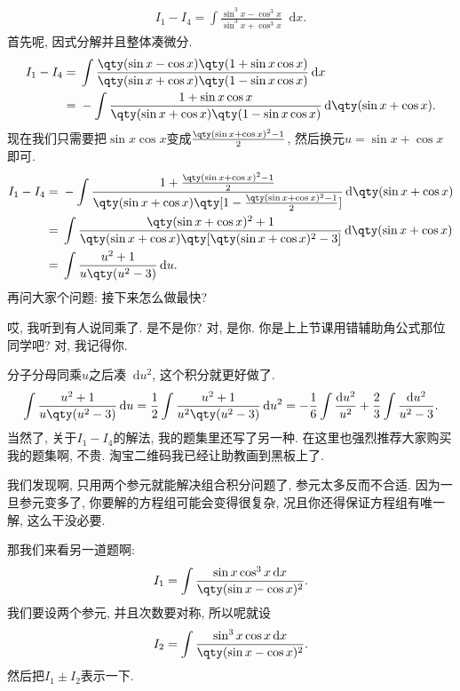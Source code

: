 \documentclass{ctexbook}
\newcommand*{\dif}{\mathop{}\!\mathrm{d}}
\begin{document}
{\begin{align*}
I_{1}-I_{4}=\int\frac{\sin^{3}{x}-\cos^{3}{x}}{\sin^{3}{x}+\cos^{3}{x}}\dif{x}
.\end{align*}
首先呢, 因式分解并且整体凑微分. 
\begin{align*}
I_{1}-I_{4}={}&\int\frac{\qty(\sin{x}-\cos{x})\qty(1+\sin{x}\cos{x})}{\qty(\sin{x}+\cos{x})\qty(1-\sin{x}\cos{x})}\dif{x}\\
={}&-\int\frac{1+\sin{x}\cos{x}}{\qty(\sin{x}+\cos{x})\qty(1-\sin{x}\cos{x})}\dif{\qty(\sin{x}+\cos{x})}
.\end{align*}
现在我们只需要把$\sin{x}\cos{x}$变成$\frac{\qty(\sin{x}+\cos{x})^{2}-1}{2}$, 然后换元$u=\sin{x}+\cos{x}$即可. 
\begin{align*}
I_{1}-I_{4}={}&-\int\frac{1+\frac{\qty(\sin{x}+\cos{x})^{2}-1}{2}}{\qty(\sin{x}+\cos{x})\qty[1-\frac{\qty(\sin{x}+\cos{x})^{2}-1}{2}]}\dif{\qty(\sin{x}+\cos{x})}\\
={}&\int\frac{\qty(\sin{x}+\cos{x})^{2}+1}{\qty(\sin{x}+\cos{x})\qty[\qty(\sin{x}+\cos{x})^{2}-3]}\dif{\qty(\sin{x}+\cos{x})}\\
={}&\int\frac{u^{2}+1}{u\qty(u^{2}-3)}\dif{u}
.\end{align*}
再问大家个问题: 接下来怎么做最快? \par
哎, 我听到有人说同乘了. 是不是你? 对, 是你. 你是上上节课用错辅助角公式那位同学吧? 对, 我记得你. \par
分子分母同乘$u$之后凑$\dif{u^{2}}$, 这个积分就更好做了. 
\begin{align*}
\int\frac{u^{2}+1}{u\qty(u^{2}-3)}\dif{u}=\frac{1}{2}\int\frac{u^{2}+1}{u^{2}\qty(u^{2}-3)}\dif{u^{2}}=-\frac{1}{6}\int\frac{\dif{u^{2}}}{u^{2}}+\frac{2}{3}\int\frac{\dif{u^{2}}}{u^{2}-3}
.\end{align*}
当然了, 关于$I_{1}-I_{4}$的解法, 我的题集里还写了另一种. 在这里也强烈推荐大家购买我的题集啊, 不贵. 淘宝二维码我已经让助教画到黑板上了. \par
我们发现啊, 只用两个参元就能解决组合积分问题了, 参元太多反而不合适. 因为一旦参元变多了, 你要解的方程组可能会变得很复杂, 况且你还得保证方程组有唯一解, 这么干没必要. \par
那我们来看另一道题啊: 
\begin{align*}
I_{1}=\int\frac{\sin{x}\cos^{3}{x}\dif{x}}{\qty(\sin{x}-\cos{x})^{2}}
.\end{align*}
我们要设两个参元, 并且次数要对称, 所以呢就设
\begin{align*}
I_{2}=\int\frac{\sin^{3}{x}\cos{x}\dif{x}}{\qty(\sin{x}-\cos{x})^{2}}
.\end{align*}
然后把$I_{1}\pm I_{2}$表示一下. 
}
\end{document}
